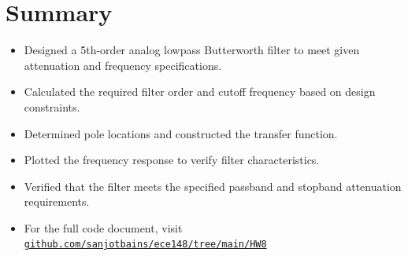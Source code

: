 \documentclass[12pt]{article}
\begin{document}
\section*{Summary}
\begin{itemize}
    \item Designed a 5th-order analog lowpass Butterworth filter to meet given attenuation and frequency specifications.
    \item Calculated the required filter order and cutoff frequency based on design constraints.
    \item Determined pole locations and constructed the transfer function.
    \item Plotted the frequency response to verify filter characteristics.
    \item Verified that the filter meets the specified passband and stopband attenuation requirements.
    \item For the full code document, visit \href{https://github.com/sanjotbains/ece148/tree/main/HW8}{\texttt{github.com/sanjotbains/ece148/tree/main/HW8}}
\end{itemize}
\end{document}

